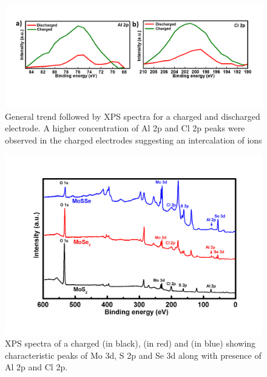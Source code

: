 \begin{figure}[htb!]
\centering
\includegraphics[width=\textwidth]{Figures/chap4fig/S5}
\caption{General trend followed by  XPS spectra for a charged and discharged electrode. A higher concentration of Al 2p and Cl 2p peaks were observed in the charged electrodes suggesting an intercalation of  ions}
\label{Figures/chap4fig:S5}
\end{figure}

\begin{figure}[htb!]
\centering
\includegraphics[width=\textwidth]{Figures/chap4fig/S6}
\caption{XPS spectra of a charged  (in black),  (in red) and  (in blue) showing characteristic peaks of Mo 3d, S 2p and Se 3d along with presence of Al 2p and Cl 2p.}
\label{Figures/chap4fig:S6}
\end{figure}

